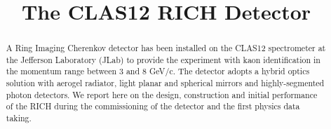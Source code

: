 \documentclass[final,5p,times,twocolumn]{elsarticle}
\begin{document}
\begin{frontmatter}



\title{The CLAS12 RICH Detector} 




\begin{abstract}
A Ring Imaging Cherenkov detector has been installed on the CLAS12 spectrometer at the 
Jefferson Laboratory (JLab) to provide the experiment with kaon identification in the momentum range between 3 and 
8 GeV/c. The detector adopts a hybrid optics solution with aerogel radiator, light planar and spherical mirrors and 
highly-segmented photon detectors.  We report here on the design, construction and initial performance of the RICH 
during the commissioning of the detector and the first physics data taking.
\end{abstract}


\end{frontmatter}
\end{document}

